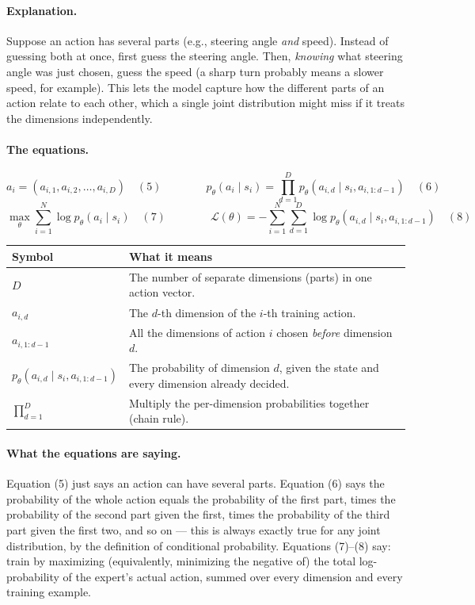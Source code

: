 \documentclass[11pt]{article}
\begin{document}
\paragraph{Explanation.}
Suppose an action has several parts (e.g., steering angle \emph{and} speed). Instead of
guessing both at once, first guess the steering angle. Then, \emph{knowing} what
steering angle was just chosen, guess the speed (a sharp turn probably means a slower
speed, for example). This lets the model capture how the different parts of an action
relate to each other, which a single joint distribution might miss if it treats the
dimensions independently.

\paragraph{The equations.}
$$a_i = (a_{i,1}, a_{i,2}, \ldots, a_{i,D}) \quad(5) \qquad\qquad
p_\theta(a_i\mid s_i) = \prod_{d=1}^{D} p_\theta\!\left(a_{i,d}\mid s_i, a_{i,1:d-1}\right) \quad(6)$$
$$\max_\theta \sum_{i=1}^N \log p_\theta(a_i\mid s_i) \quad(7) \qquad\qquad
\mathcal{L}(\theta) = -\sum_{i=1}^N \sum_{d=1}^D \log p_\theta\!\left(a_{i,d}\mid s_i, a_{i,1:d-1}\right)\quad(8)$$

\begin{center}
\begin{tabular}{@{}p{3.2cm}p{10.3cm}@{}}
\toprule
Symbol & What it means \\
\midrule
$D$ & The number of separate dimensions (parts) in one action vector. \\
$a_{i,d}$ & The $d$-th dimension of the $i$-th training action. \\
$a_{i,1:d-1}$ & All the dimensions of action $i$ chosen \emph{before} dimension $d$. \\
$p_\theta(a_{i,d}\mid s_i, a_{i,1:d-1})$ & The probability of dimension $d$, given the
state and every dimension already decided. \\
$\prod_{d=1}^D$ & Multiply the per-dimension probabilities together (chain rule). \\
\bottomrule
\end{tabular}
\end{center}

\paragraph{What the equations are saying.}
Equation (5) just says an action can have several parts. Equation (6) says the
probability of the whole action equals the probability of the first part, times the
probability of the second part given the first, times the probability of the third part
given the first two, and so on --- this is always exactly true for any joint
distribution, by the definition of conditional probability. Equations (7)--(8) say: train
by maximizing (equivalently, minimizing the negative of) the total log-probability of the
expert's actual action, summed over every dimension and every training example.
\end{document}
